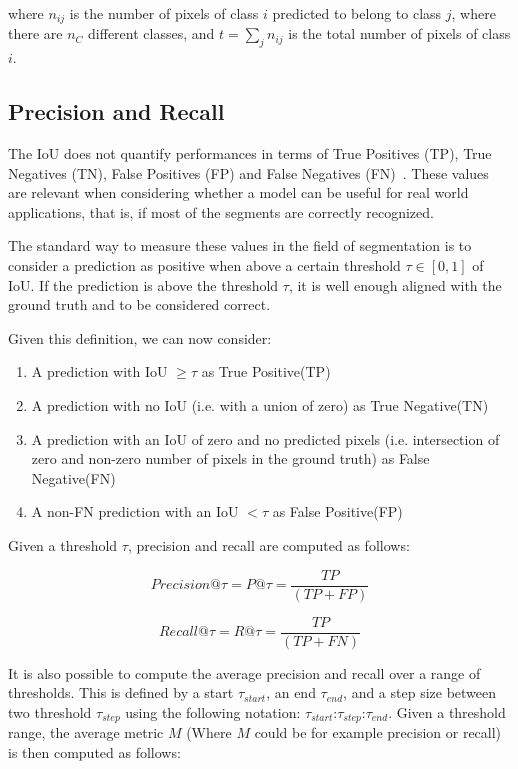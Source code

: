 \documentclass[english, bibtex]{kththesis}
\begin{document}
where $n_{ij}$ is the number of pixels of class $i$ predicted to belong to class $j$, where there are $n_{C}$ different classes, and $t = \sum_{j} n_{ij}$ is the total number of pixels of class $i$.

\subsection{Precision and Recall}

The IoU does not quantify performances in terms of True Positives (TP), True Negatives (TN), False Positives (FP) and False Negatives (FN)~\cite{davis2006relationship}. These values are relevant when considering whether a model can be useful for real world applications, that is, if most of the segments are correctly recognized. 

The standard way to measure these values in the field of segmentation is to consider a prediction as positive when above a certain threshold $\tau \in [0,1]$ of IoU. If the prediction is above the threshold $\tau$, it is well enough aligned with the ground truth and to be considered correct. 

Given this definition, we can now consider:
\begin{enumerate}
\item A prediction with IoU $\geq \tau$ as True Positive(TP)
\item A prediction with no IoU (i.e. with a union of zero) as True Negative(TN)
\item A prediction with an IoU of zero and no predicted pixels (i.e. intersection of zero and non-zero number of pixels in the ground truth) as False Negative(FN)
\item A non-FN prediction with an IoU $< \tau$ as False Positive(FP)
\end{enumerate}

Given a threshold $\tau$, precision and recall are computed as follows:

\begin{equation}
	Precision @ \tau = P@\tau = \frac{TP}{(TP + FP)}
  	\label{eqn:precision}
\end{equation}

\begin{equation}
	Recall @ \tau = R@\tau = \frac{TP}{(TP + FN)}
  	\label{eqn:recall}
\end{equation}

It is also possible to compute the average precision and recall over a range of thresholds. This is defined by a start $\tau_{start}$, an end $\tau_{end}$, and a step size between two threshold $\tau_{step}$ using the following notation: $\tau_{start}$:$\tau_{step}$:$\tau_{end}$. Given a threshold range, the average metric $M$ (Where $M$ could be for example precision or recall) is then computed as follows:
\end{document}
